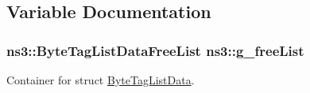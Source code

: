 \subsection{Variable Documentation}
\subsubsection[{\texorpdfstring{g\+\_\+free\+List}{g_freeList}}]{\setlength{\rightskip}{0pt plus 5cm} {\bf ns3\+::\+Byte\+Tag\+List\+Data\+Free\+List}  ns3\+::g\+\_\+free\+List\hspace{0.3cm}{\ttfamily [static]}}\hypertarget{group__packet_gaed1170b07d22fd956e755d86bf5e5f08}{}\label{group__packet_gaed1170b07d22fd956e755d86bf5e5f08}


Container for struct \hyperlink{structns3_1_1ByteTagListData}{Byte\+Tag\+List\+Data}. 

